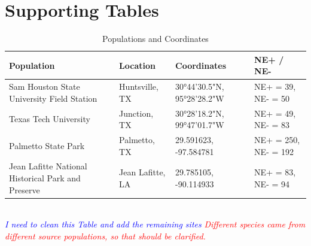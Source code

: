 \documentclass[12pt]{article}\usepackage[]{graphicx}\usepackage[dvipsnames]{xcolor}
\begin{document}
\section {Supporting Tables}

\begin{table}[H]
\centering
\caption{Populations and Coordinates}
\begin{tabular}{|p{2in}|l|l|l|}
\hline
\textbf{Population} & \textbf{Location} & \textbf{Coordinates} & \textbf{NE+ / NE-} \\ \hline
Sam Houston State University Field Station  & Huntsville, TX & 30°44'30.5"N, 95°28'28.2"W & NE+ = 39, NE- = 50 \\ \hline
Texas Tech University  & Junction, TX & 30°28'18.2"N, 99°47'01.7"W & NE+ = 49, NE- = 83 \\ \hline
Palmetto State Park  & Palmetto, TX & 29.591623, -97.584781 & NE+ = 250, NE- = 192 \\ \hline
Jean Lafitte National Historical Park and Preserve  & Jean Lafitte, LA & 29.785105, -90.114933 & NE+ = 83, NE- = 94 \\ \hline
\end{tabular}
\\[0.5em]
\textit{\textcolor{blue}{I need to clean this Table and add the remaining sites}}
\textit{\textcolor{red}{Different species came from different source populations, so that should be clarified.}}
\end{table}
\end{document}
